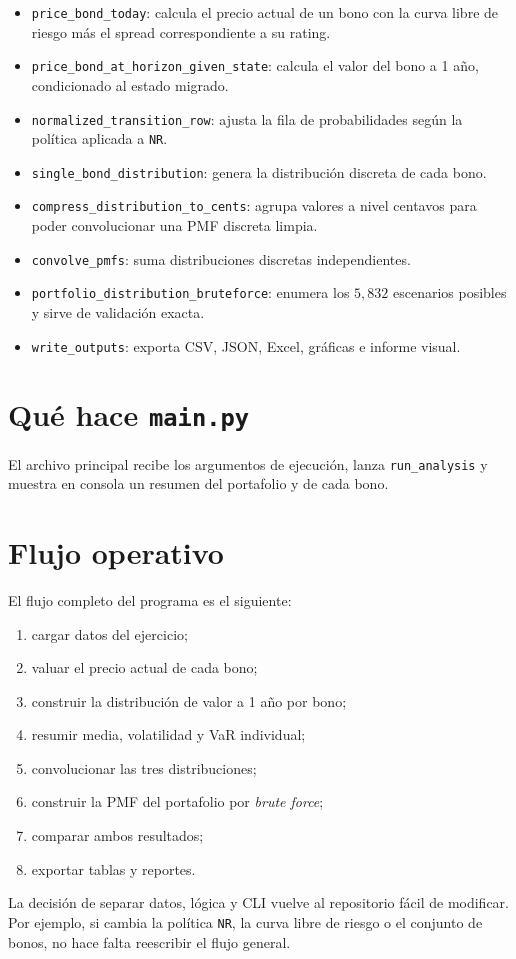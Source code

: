 \begin{itemize}
  \item \texttt{price\_bond\_today}: calcula el precio actual de un bono con la curva libre de riesgo m\'as el spread correspondiente a su rating.
  \item \texttt{price\_bond\_at\_horizon\_given\_state}: calcula el valor del bono a 1 a\~no, condicionado al estado migrado.
  \item \texttt{normalized\_transition\_row}: ajusta la fila de probabilidades seg\'un la pol\'itica aplicada a \texttt{NR}.
  \item \texttt{single\_bond\_distribution}: genera la distribuci\'on discreta de cada bono.
  \item \texttt{compress\_distribution\_to\_cents}: agrupa valores a nivel centavos para poder convolucionar una PMF discreta limpia.
  \item \texttt{convolve\_pmfs}: suma distribuciones discretas independientes.
  \item \texttt{portfolio\_distribution\_bruteforce}: enumera los \(5{,}832\) escenarios posibles y sirve de validaci\'on exacta.
  \item \texttt{write\_outputs}: exporta CSV, JSON, Excel, gr\'aficas e informe visual.
\end{itemize}

\section*{Qu\'e hace \texttt{main.py}}

El archivo principal recibe los argumentos de ejecuci\'on, lanza \texttt{run\_analysis} y muestra en consola un resumen del portafolio y de cada bono.

\section*{Flujo operativo}

El flujo completo del programa es el siguiente:

\begin{enumerate}
  \item cargar datos del ejercicio;
  \item valuar el precio actual de cada bono;
  \item construir la distribuci\'on de valor a 1 a\~no por bono;
  \item resumir media, volatilidad y VaR individual;
  \item convolucionar las tres distribuciones;
  \item construir la PMF del portafolio por \textit{brute force};
  \item comparar ambos resultados;
  \item exportar tablas y reportes.
\end{enumerate}

La decisi\'on de separar datos, l\'ogica y CLI vuelve al repositorio f\'acil de modificar. Por ejemplo, si cambia la pol\'itica \texttt{NR}, la curva libre de riesgo o el conjunto de bonos, no hace falta reescribir el flujo general.
